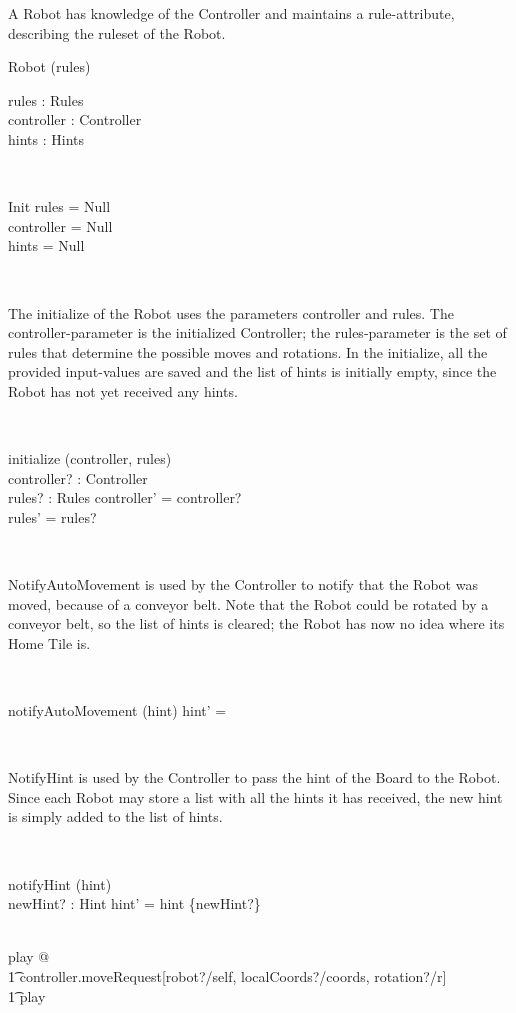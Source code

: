 A Robot has knowledge of the Controller and maintains a rule-attribute, describing the ruleset of the Robot.
\begin{class}{Robot}
\upharpoonright (rules) \\
\begin{state}
rules : Rules \\
controller : Controller \\
hints : \power Hints
\end{state}\\
\begin{schema}{Init}
rules = Null \\
controller = Null \\
hints = Null
\end{schema} \\
\begin{classcom}
The initialize of the Robot uses the parameters controller and rules. The controller-parameter is the initialized Controller; the rules-parameter is the set of rules that determine the possible moves and rotations. In the initialize, all the provided input-values are saved and the list of hints is initially empty, since the Robot has not yet received any hints.
\end{classcom} \\
\begin{schema}{initialize}
\Delta (controller, rules) \\
controller? : Controller \\
rules? : Rules
\where
controller' = controller? \\
rules' = rules?
\end{schema} \\
\begin{classcom}
NotifyAutoMovement is used by the Controller to notify that the Robot was moved, because of a conveyor belt. Note that the Robot could be rotated by a conveyor belt, so the list of hints is cleared; the Robot has now no idea where its Home Tile is.
\end{classcom} \\
\begin{schema}{notifyAutoMovement}
\Delta (hint)
\where
hint' = \emptyset
\end{schema}\\
\begin{classcom}
NotifyHint is used by the Controller to pass the hint of the Board to the Robot. Since each Robot may store a list with all the hints it has received, the new hint is simply added to the list of hints.
\end{classcom} \\
\begin{schema}{notifyHint}
\Delta (hint) \\
newHint? : Hint
\where
hint' = hint \cup \{newHint?\}
\end{schema} \\
play  @ \\ \t1 controller.moveRequest[robot?/self, localCoords?/coords, rotation?/r] \; \; \comp \\ \t1 play
\end{class}

